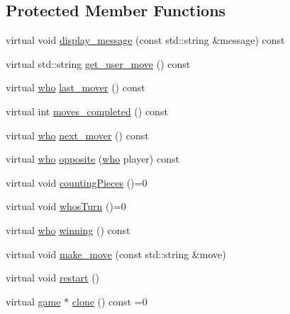 \subsection*{Protected Member Functions}
\begin{DoxyCompactItemize}
\item 
virtual void \hyperlink{classmain__savitch__14_1_1game_ab8b87c3a1b68634861a8c0ed2b9f1992}{display\+\_\+message} (const std\+::string \&message) const 
\item 
virtual std\+::string \hyperlink{classmain__savitch__14_1_1game_a1265f262f5a15bca5b532e6e97d13089}{get\+\_\+user\+\_\+move} () const 
\item 
virtual \hyperlink{classmain__savitch__14_1_1game_a4fe20fb287f809ae2b68e28e4ccba634}{who} \hyperlink{classmain__savitch__14_1_1game_a38d435da6aadc192ac10160b26ea0cc1}{last\+\_\+mover} () const 
\item 
virtual int \hyperlink{classmain__savitch__14_1_1game_aee677d1ef52c35474cb7c6071bb71749}{moves\+\_\+completed} () const 
\item 
virtual \hyperlink{classmain__savitch__14_1_1game_a4fe20fb287f809ae2b68e28e4ccba634}{who} \hyperlink{classmain__savitch__14_1_1game_a0d445fdec3201c91c145ee2763e08922}{next\+\_\+mover} () const 
\item 
virtual \hyperlink{classmain__savitch__14_1_1game_a4fe20fb287f809ae2b68e28e4ccba634}{who} \hyperlink{classmain__savitch__14_1_1game_ae38d001e92ebe46e1a1433e41446c7ab}{opposite} (\hyperlink{classmain__savitch__14_1_1game_a4fe20fb287f809ae2b68e28e4ccba634}{who} player) const 
\item 
virtual void \hyperlink{classmain__savitch__14_1_1game_a5954eccb6abf1ae900ad853ad2af99fa}{counting\+Pieces} ()=0
\item 
virtual void \hyperlink{classmain__savitch__14_1_1game_a98190a2bf784ce0f20533475754d136d}{whos\+Turn} ()=0
\item 
virtual \hyperlink{classmain__savitch__14_1_1game_a4fe20fb287f809ae2b68e28e4ccba634}{who} \hyperlink{classmain__savitch__14_1_1game_a081611c42aa66b4d91bbefeec47c7c4e}{winning} () const 
\item 
virtual void \hyperlink{classmain__savitch__14_1_1game_a20597d0caa907aea47b27fed8be3759b}{make\+\_\+move} (const std\+::string \&move)
\item 
virtual void \hyperlink{classmain__savitch__14_1_1game_ad521a7d78e7c163a0bc28b709f0d45fd}{restart} ()
\item 
virtual \hyperlink{classmain__savitch__14_1_1game}{game} $\ast$ \hyperlink{classmain__savitch__14_1_1game_a7b663057f59210dd52738facfc40d959}{clone} () const =0

\end{DoxyCompactItemize}
